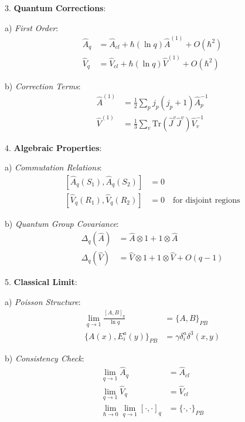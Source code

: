 \documentclass[12pt,a4paper]{article}
\begin{document}
3. \textbf{Quantum Corrections}:
   
   a) \textit{First Order}:
      \[
      \begin{aligned}
      \hat{A}_q &= \hat{A}_{cl} + \hbar(\ln q)\hat{A}^{(1)} + O(\hbar^2) \\
      \hat{V}_q &= \hat{V}_{cl} + \hbar(\ln q)\hat{V}^{(1)} + O(\hbar^2)
      \end{aligned}
      \]
   
   b) \textit{Correction Terms}:
      \[
      \begin{aligned}
      \hat{A}^{(1)} &= \frac{1}{2}\sum_{p} j_p(j_p+1)\hat{A}_p^{-1} \\
      \hat{V}^{(1)} &= \frac{1}{3}\sum_{v} \text{Tr}(\hat{J}^v\hat{J}^v)\hat{V}_v^{-1}
      \end{aligned}
      \]

4. \textbf{Algebraic Properties}:
   
   a) \textit{Commutation Relations}:
      \[
      \begin{aligned}
      [\hat{A}_q(S_1), \hat{A}_q(S_2)] &= 0 \\
      [\hat{V}_q(R_1), \hat{V}_q(R_2)] &= 0 \quad \text{for disjoint regions}
      \end{aligned}
      \]
   
   b) \textit{Quantum Group Covariance}:
      \[
      \begin{aligned}
      \Delta_q(\hat{A}) &= \hat{A} \otimes 1 + 1 \otimes \hat{A} \\
      \Delta_q(\hat{V}) &= \hat{V} \otimes 1 + 1 \otimes \hat{V} + O(q-1)
      \end{aligned}
      \]

5. \textbf{Classical Limit}:
   
   a) \textit{Poisson Structure}:
      \[
      \begin{aligned}
      \lim_{q \to 1}\frac{[A,B]_q}{\ln q} &= \{A,B\}_{PB} \\
      \{A(x),E^a_i(y)\}_{PB} &= \gamma\delta^a_i\delta^3(x,y)
      \end{aligned}
      \]
   
   b) \textit{Consistency Check}:
      \[
      \begin{aligned}
      \lim_{q \to 1}\hat{A}_q &= \hat{A}_{cl} \\
      \lim_{q \to 1}\hat{V}_q &= \hat{V}_{cl} \\
      \lim_{\hbar \to 0}\lim_{q \to 1}[\cdot,\cdot]_q &= \{\cdot,\cdot\}_{PB}
      \end{aligned}
      \]
\end{document}
